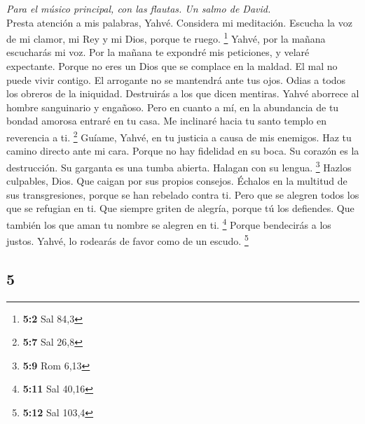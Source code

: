 \begin{paracol}{2}
\emph{Para el músico principal, con las flautas. Un salmo de David.}\\
 Presta atención a mis palabras, Yahvé. Considera mi
meditación.  Escucha la voz de mi clamor, mi Rey y mi
Dios, porque te ruego. \footnote{\textbf{5:2} Sal 84,3} 
Yahvé, por la mañana escucharás mi voz. Por la mañana te expondré mis
peticiones, y velaré expectante.  Porque no eres un Dios
que se complace en la maldad. El mal no puede vivir contigo.
 El arrogante no se mantendrá ante tus ojos. Odias a todos
los obreros de la iniquidad.  Destruirás a los que dicen
mentiras. Yahvé aborrece al hombre sanguinario y engañoso.
 Pero en cuanto a mí, en la abundancia de tu bondad
amorosa entraré en tu casa. Me inclinaré hacia tu santo templo en
reverencia a ti. \footnote{\textbf{5:7} Sal 26,8}  Guíame,
Yahvé, en tu justicia a causa de mis enemigos. Haz tu camino directo
ante mi cara.  Porque no hay fidelidad en su boca. Su
corazón es la destrucción. Su garganta es una tumba abierta. Halagan con
su lengua. \footnote{\textbf{5:9} Rom 6,13}  Hazlos
culpables, Dios. Que caigan por sus propios consejos. Échalos en la
multitud de sus transgresiones, porque se han rebelado contra ti.
 Pero que se alegren todos los que se refugian en ti. Que
siempre griten de alegría, porque tú los defiendes. Que también los que
aman tu nombre se alegren en ti. \footnote{\textbf{5:11} Sal 40,16}
 Porque bendecirás a los justos. Yahvé, lo rodearás de
favor como de un escudo. \footnote{\textbf{5:12} Sal 103,4}

\switchcolumn
\begin{otherlanguage}{english}

\hypertarget{section-9}{%
\section{5}\label{section-9}}


\end{otherlanguage}
\end{paracol}
